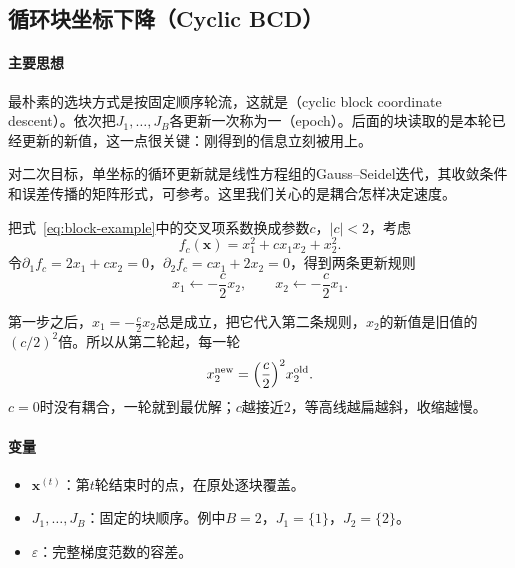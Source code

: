 \subsection{循环块坐标下降（Cyclic BCD）}
\label{sec:block-cyclic}

\paragraph{主要思想}
最朴素的选块方式是按固定顺序轮流，这就是（cyclic block coordinate descent）。依次把$J_1,\ldots,J_B$各更新一次称为一（epoch）。后面的块读取的是本轮已经更新的新值，这一点很关键：刚得到的信息立刻被用上。

对二次目标，单坐标的循环更新就是线性方程组的Gauss--Seidel迭代，其收敛条件和误差传播的矩阵形式，可参考。这里我们关心的是耦合怎样决定速度。

把式~\eqref{eq:block-example}中的交叉项系数换成参数$c$，$\lvert c\rvert<2$，考虑
\begin{equation}
 f_c(\bm{x})=x_1^2+cx_1x_2+x_2^2 .
 \label{eq:block-coupling-family}
\end{equation}
令$\partial_1f_c=2x_1+cx_2=0$，$\partial_2f_c=cx_1+2x_2=0$，得到两条更新规则
\begin{equation}
 x_1\leftarrow-\frac{c}{2}x_2,\qquad x_2\leftarrow-\frac{c}{2}x_1 .
 \label{eq:block-cyclic-update}
\end{equation}

第一步之后，$x_1=-\tfrac{c}{2}x_2$总是成立，把它代入第二条规则，$x_2$的新值是旧值的$(c/2)^2$倍。所以从第二轮起，每一轮
\begin{equation}
 x_2^{\mathrm{new}}=\Bigl(\frac{c}{2}\Bigr)^{2}x_2^{\mathrm{old}} .
 \label{eq:block-cyclic-factor}
\end{equation}
$c=0$时没有耦合，一轮就到最优解；$c$越接近$2$，等高线越扁越斜，收缩越慢。

\paragraph{变量}
\begin{itemize}
 \item $\bm{x}^{(t)}$：第$t$轮结束时的点，在原处逐块覆盖。
 \item $J_1,\ldots,J_B$：固定的块顺序。例中$B=2$，$J_1=\{1\}$，$J_2=\{2\}$。
 \item $\varepsilon$：完整梯度范数的容差。
\end{itemize}

